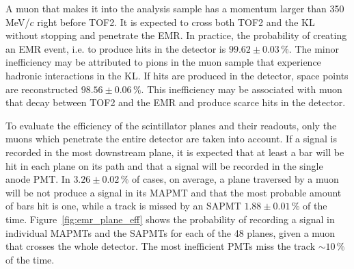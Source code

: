 
A muon that makes it into the analysis sample has a momentum larger than 350\,MeV/$c$ right before TOF2. It is expected to cross both TOF2 and the KL without stopping and penetrate the EMR. In practice, the probability of creating an EMR event, i.e. to produce hits in the detector is $99.62\pm0.03\,\%$. The minor inefficiency may be attributed to pions in the muon sample that experience hadronic interactions in the KL. If hits are produced in the detector, space points are reconstructed $98.56\pm0.06\,\%$. This inefficiency may be associated with muon that decay between TOF2 and the EMR and produce scarce hits in the detector.

To evaluate the efficiency of the scintillator planes and their readouts, only the muons which penetrate the entire detector are taken into account. If a signal is recorded in the most downstream plane, it is expected that at least a bar will be hit in each plane on its path and that a signal will be recorded in the single anode PMT.
In $3.26\pm0.02\,\%$ of cases, on average, a plane traversed by a muon will be not produce a signal in its MAPMT and that the most probable amount of bars hit is one, while
a track is missed by an SAPMT $1.88\pm0.01\,\%$ of the time. 
Figure~\ref{fig:emr_plane_eff} shows the probability of recording a signal in individual MAPMTs and the SAPMTs for each of the 48 planes, given a muon that crosses the whole detector. The most inefficient PMTs miss the track $\sim10\,\%$ of the time.

